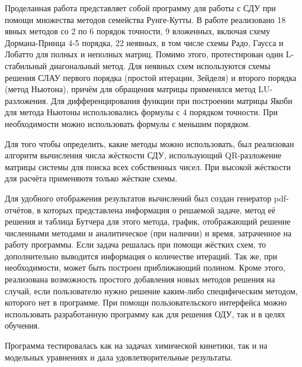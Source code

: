 \conclusion

Проделанная работа представляет собой программу для работы с СДУ при помощи множества методов семейства Рунге-Кутты. В работе
реализовано 18 явных методов со 2 по 6 порядок точности, 9 вложенных, включая схему Дормана-Принца 4-5 порядка, 22 неявных, в том числе
схемы Радо, Гаусса и Лобатто для полных и неполных матриц. Помимо этого, протестирован один L-стабильный диагональный метод. Для
неявных схем используются схемы решения СЛАУ первого порядка (простой итерации, Зейделя) и второго порядка (метод Ньютона), причём
для обращения
матрицы применялся метод LU-разложения. Для дифференцирования функции при построении матрицы Якоби для метода Ньютоны использовались
формулы с 4 порядком точности. При необходимости можно использовать формулы с меньшим порядком.

Для того чтобы определить, какие методы можно использовать, был реализован алгоритм вычисления числа жёсткости СДУ, использующий
QR-разложение матрицы системы для поиска всех собственных чисел. При высокой жёсткости для расчёта применяютя только жёсткие
схемы.

Для удобного отображения результатов вычислений был создан генератор pdf-отчётов, в которых представлена информация о решаемой задаче,
метод её решения и таблица Бутчера для этого метода, график, отображающий решение численными методами и аналитическое (при наличии) и
время, затраченное на работу программы. Если задача решалась при помощи жёстких схем, то дополнительно выводится информация о
количестве итераций. Так же, при необходимости, может быть построен приближающий полином. Кроме этого, реализована возможность простого
добавления новых методов решения на случай, если пользователю нужно решение каким-либо специфическим методом, которого нет в программе.
При помощи пользовательского интерфейса можно использовать разработанную программу как для решения ОДУ, так и в целях обучения.

Программа тестировалась как на задачах химической кинетики, так и на модельных уравнениях и дала удовлетворительные результаты.